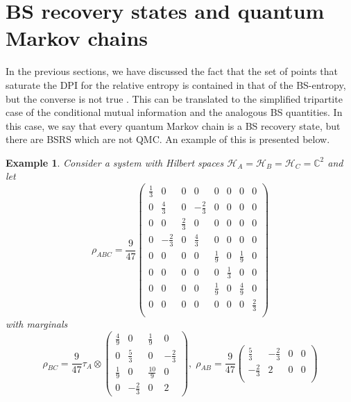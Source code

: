 \documentclass[11pt]{article}
\theoremstyle{newdefinition}
\theoremstyle{newplain}
\newtheorem{example}[definition]{Example}
\theoremstyle{myplain}
\DeclareMathOperator{\1}{\mathds{1}}
\begin{document}
\section{BS recovery states and quantum Markov chains}

In the previous sections, we have discussed the fact that the set of points that saturate the DPI for the relative entropy is contained in that of the BS-entropy, but the converse is not true \cite{HiaiMosonyi-f-divergences-2017,Jencova2009}. This can be translated to the simplified tripartite case of the conditional mutual information and the analogous BS quantities. In this case, we say that every quantum Markov chain is a BS recovery state, but there are BSRS which are not QMC. An example of this is presented below.

\begin{example}
Consider a system with Hilbert spaces $\mathcal{H}_A=\mathcal{H}_B=\mathcal{H}_C=\mathbb{C}^2$ and let
\begin{equation}
    \rho_{ABC}=\frac{9}{47} \begin{pmatrix}
       \frac{1}{3} & 0 &0 &0 &0&0&0&0\\
       0 &\frac{4}{3}&0&-\frac{2}{3}&0&0&0&0\\
       0 & 0 & \frac{2}{3} &0&0&0&0&0\\
       0 & -\frac{2}{3}& 0& \frac{4}{3}&0&0&0&0\\
       0&0&0&0&\frac{1}{9}&0&\frac{1}{9}&0\\
       0&0&0&0&0&\frac{1}{3}&0&0\\
       0&0&0&0&\frac{1}{9}&0&\frac{4}{9}&0\\
       0&0&0&0&0&0&0&\frac{2}{3}\\
    \end{pmatrix}
\end{equation}
with marginals
\begin{equation}
    \rho_{BC}=\frac{9}{47}\tau_A\otimes\begin{pmatrix}
        \frac{4}{9}&0 &\frac{1}{9}&0\\
        0&\frac{5}{3}&0&-\frac{2}{3}\\
        \frac{1}{9}&0&\frac{10}{9}&0\\
        0&-\frac{2}{3}&0&2
    \end{pmatrix},\; \rho_{AB}=\frac{9}{47}\begin{pmatrix}
        \frac{5}{3}& -\frac{2}{3}&0 &0\\
        -\frac{2}{3}&2&0&0\\

\end{pmatrix}
\end{equation}
\end{example}
\end{document}
